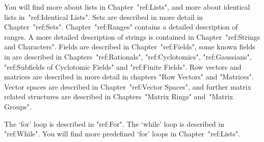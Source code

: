 % 
% 
You will find more about lists in Chapter~"ref:Lists",
and more about identical lists in~"ref:Identical Lists".
% 
Sets are described in more detail in Chapter~"ref:Sets".
% 
Chapter~"ref:Ranges" contains a detailed description of ranges.
% 
A more detailed description of strings is contained in
Chapter~"ref:Strings and Characters".
% 
% 
Fields are described in Chapter~"ref:Fields",
some known fields in {\GAP} are described in Chapters~"ref:Rationals",
"ref:Cyclotomics", "ref:Gaussians", "ref:Subfields of Cyclotomic  Fields"
and "ref:Finite Fields".
Row vectors and matrices are described in more detail in chapters
"Row Vectors" and "Matrices".
Vector spaces are described in Chapter~"ref:Vector Spaces",
and further matrix related structures are described in Chapters~"Matrix Rings" and~"Matrix Groups".
% 

The `for' loop is described in "ref:For".
The `while' loop is described in "ref:While".
% 
You will find more predefined `for' loops in Chapter~"ref:Lists".

